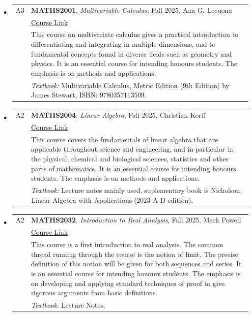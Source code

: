 \documentclass[12pt]{article}
\begin{document}
\begin{itemize}[leftmargin = *]
    \item[] \begin{tabularx}{\textwidth}{@{}lX@{}}
            A3 & \textbf{MATHS2001}, \textit{Multivariable Calculus}, Fall 2025, Ana G. Lecuona
            \\
            &
            \href{https://www.gla.ac.uk/coursecatalogue/course/?code=MATHS2001}{Course Link} \\
            &
            This course on multivariate calculus gives a practical introduction to differentiating and integrating in multiple dimensions, and to fundamental concepts found in diverse fields such as geometry and physics. It is an essential course for intending honours students. The emphasis is on methods and applications.            \\
            & \textit{Textbook:} Multivariable Calculus, Metric Edition (9th Edition) by James Stewart; ISBN: 9780357113509.
        \end{tabularx}
            \item[]
        \begin{tabularx}{\textwidth}{@{}lX@{}}
            A2 & \textbf{MATHS2004}, \textit{Linear Algebra}, Fall 2025,  Christian Korff
            \\
            &
            \href{https://www.gla.ac.uk/coursecatalogue/course/?code=MATHS2004}{Course Link} \\
            &
            This course covers the fundamentals of linear algebra that are applicable throughout science and engineering, and in particular in the physical, chemical and biological sciences, statistics and other parts of mathematics. It is an essential course for intending honours students. The emphasis is on methods and applications.            \\
            & \textit{Textbook:} Lecture notes mainly used, suplementary book is Nicholson, Linear Algebra with Applications (2023 A-D edition).
        \end{tabularx}
         \item[]
        \begin{tabularx}{\textwidth}{@{}lX@{}}
            A2 & \textbf{MATHS2032}, \textit{Introduction to Real Analysis}, Fall 2025,  Mark Powell
            \\
            &
            \href{https://www.gla.ac.uk/coursecatalogue/course/?code=MATHS2032}{Course Link} \\
            &
            This course is a first introduction to real analysis. The common thread running through the course is the notion of limit. The precise definition of this notion will be given for both sequences and series. It is an essential course for intending honours students. The emphasis is on developing and applying standard techniques of proof to give rigorous arguments from basic definitions.            \\
            & \textit{Textbook:}  Lecture Notes.
        \end{tabularx}


\end{itemize}
\end{document}
